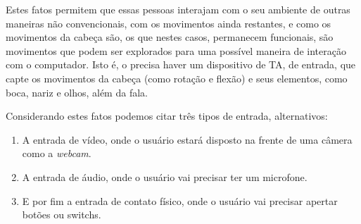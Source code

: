 


Estes fatos permitem que essas pessoas interajam com o seu ambiente de outras maneiras não convencionais, com os movimentos ainda restantes, e como os movimentos da cabeça são, os que nestes casos, permanecem funcionais, são movimentos que podem ser explorados para uma possível maneira de interação com o computador. Isto é, o precisa haver um dispositivo de TA, de entrada, que capte os movimentos da cabeça (como rotação e flexão) e seus elementos, como boca, nariz e olhos, além da fala. 

Considerando estes fatos podemos citar três tipos de entrada, alternativos:
\begin{enumerate}
\item A entrada de vídeo, onde o usuário estará disposto na frente de uma câmera como a \textit{webcam}.
\item A entrada de áudio, onde o usuário vai precisar ter um microfone.
\item E por fim a entrada de contato físico, onde o usuário vai precisar apertar botões ou switchs.
\end{enumerate}

% 
% 


